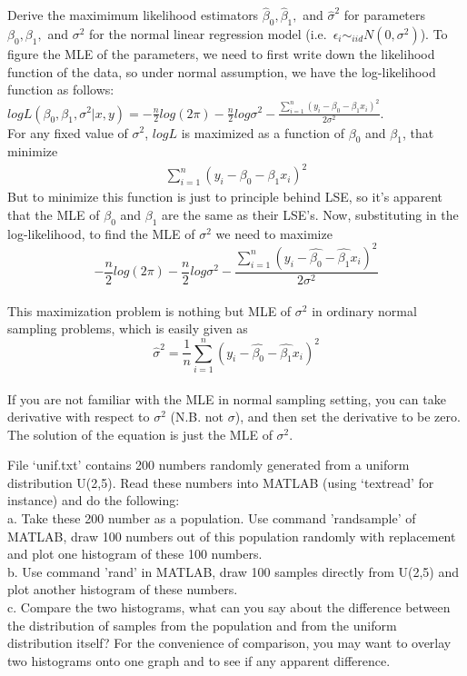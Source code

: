 \documentclass[12pt]{article}
\begin{document}
 { Derive the maximimum likelihood estimators $\hat
\beta_0, \hat \beta_1,$ and $\hat \sigma^2$ for parameters $\beta_0,
\beta_1,$ and $\sigma^2$ for the normal linear regression model
(i.e.~$\epsilon_i \sim_{iid} N(0,\sigma^2)$). } { \vfill
  \answer
}
{
To figure the MLE of the parameters, we need to first write down
the likelihood function of the data, so under normal assumption, we
have the log-likelihood function as follows:\\
$logL(\beta_0,\beta_1,\sigma^2|x,y)=-\frac{n}{2}log(2\pi)-\frac{n}{2}log\sigma^2-\frac{\displaystyle\sum_{i=1}^{n}(y_i-\beta_0-\beta_1x_i)^2}{2\sigma^2}.$\\
For any fixed value of $\sigma^2$, $logL$ is maximized as a function
of $\beta_0$ and $\beta_1$, that minimize
\begin{eqnarray}
\displaystyle\sum_{i=1}^{n}(y_i-\beta_0-\beta_1x_i)^2
\end{eqnarray}
But to minimize this function is just to principle behind LSE, so
it's apparent that the MLE of $\beta_0$ and $\beta_1$ are the same
as their LSE's. Now, substituting in the log-likelihood, to find the
MLE of $\sigma^2$ we need to maximize\\
\[-\frac{n}{2}log(2\pi)-\frac{n}{2}log\sigma^2-\frac{\displaystyle\sum_{i=1}^{n}(y_i-\hat{\beta_0}-\hat{\beta_1}x_i)^2}{2\sigma^2}\]\\
This maximization problem is nothing but MLE of $\sigma^2$ in
ordinary normal sampling problems, which is easily given as\\
\[\hat{\sigma}^2=\frac{1}{n}\displaystyle\sum_{i=1}^{n}(y_i-\hat{\beta_0}-\hat{\beta_1}x_i)^2\]\\
If you are not familiar with the MLE in normal sampling setting, you
can take derivative with respect to $\sigma^2$ (N.B. not $\sigma$),
and then set the derivative to be zero. The solution of the equation
is just the MLE of $\sigma^2$.\\
}

 { File `unif.txt' contains 200 numbers randomly
generated from a uniform distribution U(2,5). Read these numbers into MATLAB (using `textread' for instance) and do the following: \\
a. Take these 200 number as a population. Use command 'randsample'
of MATLAB, draw 100 numbers out of this population randomly with
replacement and plot one histogram of
these 100 numbers.\\
b. Use command 'rand' in MATLAB, draw 100 samples directly from
U(2,5) and plot another histogram of these numbers.\\
c. Compare the two histograms, what can you say about the difference
between the distribution of samples from the population and from the
uniform distribution itself? For the convenience of comparison, you
may want to overlay two histograms onto one graph and to see if any
apparent difference. }
 { \vfill
  \answer
} { }
\end{document}
